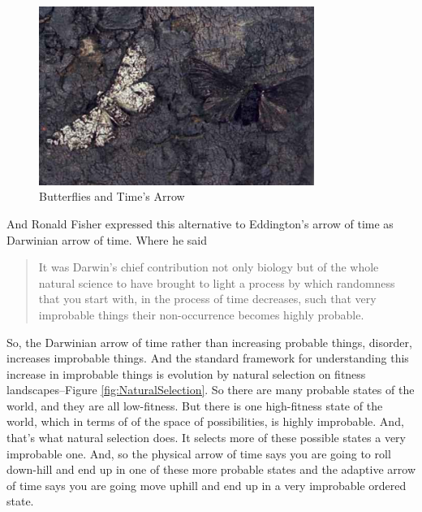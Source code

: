 \documentclass[]{article}
\begin{document}
\begin{figure}[H]
	\begin{center}
		\caption{Butterflies and Time's Arrow}\label{fig:butterflies}
		\includegraphics[width=0.8\textwidth]{butterflies}
	\end{center}
\end{figure}

And Ronald Fisher expressed this alternative
to Eddington's arrow of time as Darwinian arrow
of time. Where he said 
\begin{quotation}
	It was Darwin's chief contribution not only biology but of the whole natural science to have brought to light a process by which randomness that you start with, in the process of time decreases, such that very improbable things their non-occurrence becomes highly probable.
\end{quotation}

So, the Darwinian arrow of time rather than
increasing probable things, disorder, increases
improbable things.
And the standard framework for understanding this
increase in improbable things is evolution by
natural selection on fitness landscapes--Figure \ref{fig:NaturalSelection}. So there are
many probable states of the world, and they
are all low-fitness. But there is one
high-fitness state of the world, which in terms of
of the space of possibilities, is highly improbable.
And, that's what natural selection does.
It selects more of these possible states
a very improbable one. And, so the
physical arrow of time says you are going to roll down-hill
and end up in one of these more probable states
and the adaptive arrow of time says you are
going move uphill and end up in a very improbable ordered state.
\end{document}
